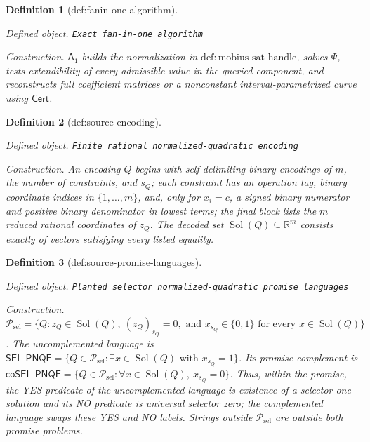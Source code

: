 \documentclass{article}
\newtheorem{definition}{Definition}
\begin{document}
\begin{definition}[def:fanin-one-algorithm]\label{def:fanin-one-algorithm}
\par\smallskip\noindent\emph{Defined object.} \texttt{Exact fan-\allowbreak{}in-\allowbreak{}one algorithm}
\par\smallskip\noindent\emph{Construction.} \(\mathsf A_1\) builds the normalization in \(\mathrm{def:mobius\mbox{-}sat\mbox{-}handle}\), solves \(\Psi\), tests extendibility of every admissible value in the queried component, and reconstructs full coefficient matrices or a nonconstant interval-parametrized curve using \(\mathsf{Cert}\).
\end{definition}

\begin{definition}[def:source-encoding]\label{def:source-encoding}
\par\smallskip\noindent\emph{Defined object.} \texttt{Finite rational normalized-\allowbreak{}quadratic encoding}
\par\smallskip\noindent\emph{Construction.} An encoding \(Q\) begins with self-delimiting binary encodings of \(m\), the number of constraints, and \(s_Q\); each constraint has an operation tag, binary coordinate indices in \(\{1,\ldots,m\}\), and, only for \(x_i=c\), a signed binary numerator and positive binary denominator in lowest terms; the final block lists the \(m\) reduced rational coordinates of \(z_Q\). The decoded set \(\operatorname{Sol}(Q)\subseteq\mathbb R^m\) consists exactly of vectors satisfying every listed equality.
\end{definition}

\begin{definition}[def:source-promise-languages]\label{def:source-promise-languages}
\par\smallskip\noindent\emph{Defined object.} \texttt{Planted selector normalized-\allowbreak{}quadratic promise languages}
\par\smallskip\noindent\emph{Construction.} \(\mathcal P_{\mathrm{sel}}=\{Q:z_Q\in\operatorname{Sol}(Q),\ (z_Q)_{s_Q}=0,\text{ and }x_{s_Q}\in\{0,1\}\text{ for every }x\in\operatorname{Sol}(Q)\}\). The uncomplemented language is \(\mathsf{SEL\mbox{-}PNQF}=\{Q\in\mathcal P_{\mathrm{sel}}:\exists x\in\operatorname{Sol}(Q)\text{ with }x_{s_Q}=1\}\). Its promise complement is \(\mathsf{coSEL\mbox{-}PNQF}=\{Q\in\mathcal P_{\mathrm{sel}}:\forall x\in\operatorname{Sol}(Q),\ x_{s_Q}=0\}\). Thus, within the promise, the YES predicate of the uncomplemented language is existence of a selector-one solution and its NO predicate is universal selector zero; the complemented language swaps these YES and NO labels. Strings outside \(\mathcal P_{\mathrm{sel}}\) are outside both promise problems.
\end{definition}
\end{document}
